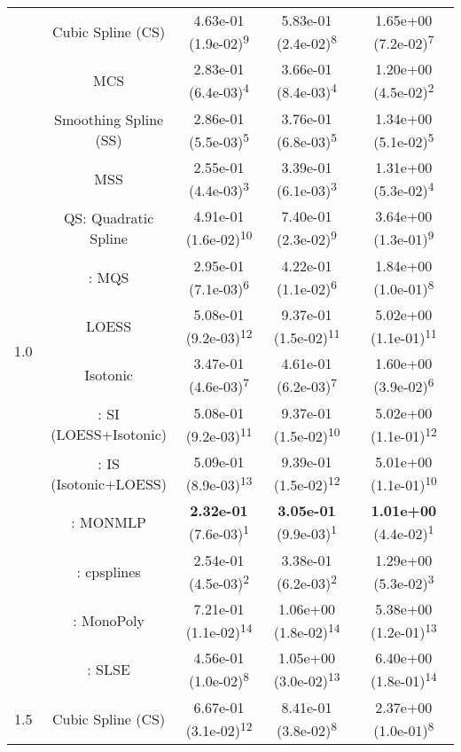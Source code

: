 \begin{tabular}{ccccc}
\multirow{14}{*}{1.0}&Cubic Spline (CS)& 4.63e-01 (1.9e-02)\textsuperscript{9}& 5.83e-01 (2.4e-02)\textsuperscript{8}& 1.65e+00 (7.2e-02)\textsuperscript{7}\tabularnewline
&MCS& 2.83e-01 (6.4e-03)\textsuperscript{4}& 3.66e-01 (8.4e-03)\textsuperscript{4}& 1.20e+00 (4.5e-02)\textsuperscript{2}\tabularnewline
&Smoothing Spline (SS)& 2.86e-01 (5.5e-03)\textsuperscript{5}& 3.76e-01 (6.8e-03)\textsuperscript{5}& 1.34e+00 (5.1e-02)\textsuperscript{5}\tabularnewline
&MSS& 2.55e-01 (4.4e-03)\textsuperscript{3}& 3.39e-01 (6.1e-03)\textsuperscript{3}& 1.31e+00 (5.3e-02)\textsuperscript{4}\tabularnewline
&QS: Quadratic Spline& 4.91e-01 (1.6e-02)\textsuperscript{10}& 7.40e-01 (2.3e-02)\textsuperscript{9}& 3.64e+00 (1.3e-01)\textsuperscript{9}\tabularnewline
&\textcite{heMonotoneBsplineSmoothing1998}: MQS& 2.95e-01 (7.1e-03)\textsuperscript{6}& 4.22e-01 (1.1e-02)\textsuperscript{6}& 1.84e+00 (1.0e-01)\textsuperscript{8}\tabularnewline
&LOESS& 5.08e-01 (9.2e-03)\textsuperscript{12}& 9.37e-01 (1.5e-02)\textsuperscript{11}& 5.02e+00 (1.1e-01)\textsuperscript{11}\tabularnewline
&Isotonic& 3.47e-01 (4.6e-03)\textsuperscript{7}& 4.61e-01 (6.2e-03)\textsuperscript{7}& 1.60e+00 (3.9e-02)\textsuperscript{6}\tabularnewline
&\textcite{mammenEstimatingSmoothMonotone1991}: SI (LOESS+Isotonic)& 5.08e-01 (9.2e-03)\textsuperscript{11}& 9.37e-01 (1.5e-02)\textsuperscript{10}& 5.02e+00 (1.1e-01)\textsuperscript{12}\tabularnewline
&\textcite{mammenEstimatingSmoothMonotone1991}: IS (Isotonic+LOESS)& 5.09e-01 (8.9e-03)\textsuperscript{13}& 9.39e-01 (1.5e-02)\textsuperscript{12}& 5.01e+00 (1.1e-01)\textsuperscript{10}\tabularnewline
&\textcite{cannonMonmlpMultilayerPerceptron2017}: MONMLP& \textbf{2.32e-01} (7.6e-03)\textsuperscript{1}& \textbf{3.05e-01} (9.9e-03)\textsuperscript{1}& \textbf{1.01e+00} (4.4e-02)\textsuperscript{1}\tabularnewline
&\textcite{navarro-garciaConstrainedSmoothingOutofrange2023}: cpsplines& 2.54e-01 (4.5e-03)\textsuperscript{2}& 3.38e-01 (6.2e-03)\textsuperscript{2}& 1.29e+00 (5.3e-02)\textsuperscript{3}\tabularnewline
&\textcite{murrayFastFlexibleMethods2016a}: MonoPoly& 7.21e-01 (1.1e-02)\textsuperscript{14}& 1.06e+00 (1.8e-02)\textsuperscript{14}& 5.38e+00 (1.2e-01)\textsuperscript{13}\tabularnewline
&\textcite{groeneboomConfidenceIntervalsMonotone2023}: SLSE& 4.56e-01 (1.0e-02)\textsuperscript{8}& 1.05e+00 (3.0e-02)\textsuperscript{13}& 6.40e+00 (1.8e-01)\textsuperscript{14}\tabularnewline
\midrule
\multirow{14}{*}{1.5}&Cubic Spline (CS)& 6.67e-01 (3.1e-02)\textsuperscript{12}& 8.41e-01 (3.8e-02)\textsuperscript{8}& 2.37e+00 (1.0e-01)\textsuperscript{8}\tabularnewline

\end{tabular}

